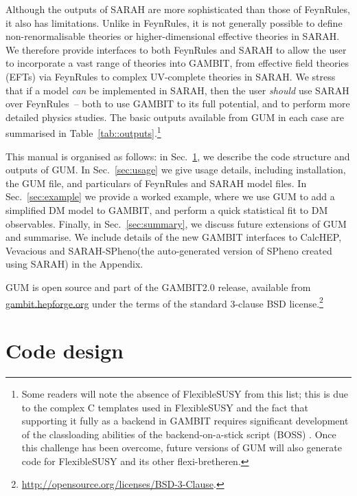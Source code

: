 \documentclass[pdftex,twocolumn,epjc3_preprint,runningheads]{svjour3}
\renewcommand{\_}{\discretionary{\underscore}{}{\underscore}}
\newcommand{\gambit}{\textsf{GAMBIT}\xspace}
\newcommand{\BOSS}{\textsf{BOSS}\xspace}
\newcommand{\GB}{\gambit}
\newcommand\FS{\FlexibleSUSY}
\newcommand\flexiblesusy{\FlexibleSUSY}
\newcommand\FlexibleSUSY{\textsf{FlexibleSUSY}\xspace}
\newcommand{\gum}{\textsf{GUM}\xspace}
\newcommand{\fr}{\textsf{FeynRules}\xspace}
\newcommand{\sarah}{\textsf{SARAH}\xspace}
\newcommand{\CH}{\textsf{CalcHEP}\xspace}
\newcommand{\veva}{\textsf{Vevacious}\xspace}
\newcommand{\spheno}{\textsf{SPheno}\xspace}
\newcommand\xx{\raisebox{0.2ex}{\smaller ++}\xspace}
\newcommand\Cpp{\textsf{C\xx}\xspace}
\begin{document}
Although the outputs of \sarah are more sophisticated than those of \fr, it also has limitations. Unlike in \fr, it is not generally possible to define non-renormalisable theories or higher-dimensional effective theories in \sarah. We therefore provide interfaces to both \fr and \sarah to allow the user to incorporate a vast range of theories into \GB, from effective field theories (EFTs) via \fr to complex UV-complete theories in \sarah. We stress that if a model \emph{can} be implemented in \sarah, then the user \emph{should} use \sarah over \fr\ -- both to use \GB to its full potential, and to perform more detailed physics studies.  The basic outputs available from \gum in each case are summarised in Table~\ref{tab::outputs}.\footnote{Some readers will note the absence of \FS from this list; this is due to the complex \Cpp templates used in \FS and the fact that supporting it fully as a backend in \gambit requires significant development of the classloading abilities of the backend-on-a-stick script (\BOSS) \cite{gambit}. Once this challenge has been overcome, future versions of \gum will also generate code for \flexiblesusy and its other flexi-bretheren. }

This manual is organised as follows: in Sec.~\ref{sec:code}, we describe the code structure and outputs of \gum. In Sec.~\ref{sec:usage} we give usage details, including installation, the \gum file, and particulars of \fr and \sarah model files. In Sec.~\ref{sec:example} we provide a worked example, where we use \gum to add a simplified DM model to \GB, and perform a quick statistical fit to DM observables. Finally, in Sec.~\ref{sec:summary}, we discuss future extensions of \gum and summarise. We include details of the new \GB interfaces to \CH, \veva and \sarah-\spheno (the auto-generated version of \spheno created using \sarah) in the Appendix.

\gum is open source and part of the \gambit \textsf{2.0} release, available from \href{http://gambit.hepforge.org}{gambit.hepforge.org} under the terms of the standard 3-clause BSD license.\footnote{\href{http://opensource.org/licenses/BSD-3-Clause}{http://opensource.org/licenses/BSD-3-Clause}.}

\section{Code design}\label{sec:code}
\end{document}
